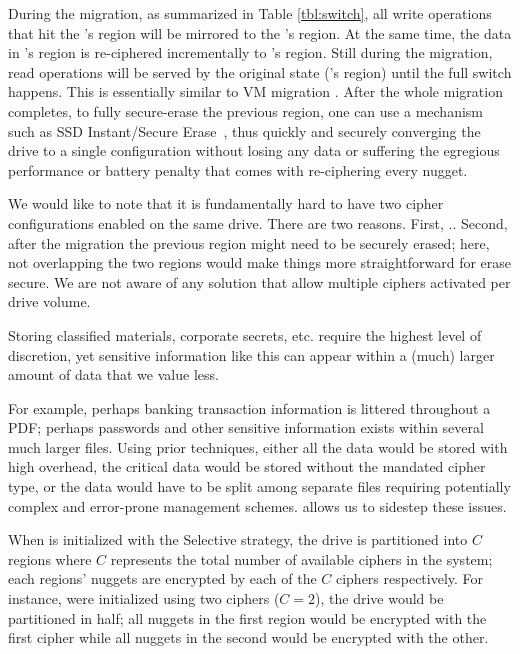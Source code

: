 During the migration, as summarized in Table \cref{tbl:switch}, all write
operations that hit the \cone's region will be mirrored to the \ctwo's region.
At the same time, the data in \cone's region is re-ciphered incrementally to
\ctwo's region. Still during the migration, read operations will be served by
the original state (\cone's region) until the full switch happens. This is
essentially similar to VM migration \cite{google-live-vm-migration-nsdi}. After
the whole migration completes, to fully secure-erase the previous region, one
can use a mechanism such as SSD Instant/Secure Erase~\cite{ISE1,ISE2,ISE3}, thus
quickly and securely converging the drive to a single configuration without
losing any data or suffering the egregious performance or battery penalty that
comes with re-ciphering every nugget.

We would like to note that it is fundamentally hard to have two cipher
configurations enabled on the same drive. There are two reasons. First,
.. Second, after the migration the
previous region might need to be securely erased; here, not overlapping the two
regions would make things more straightforward for erase secure. We are not
aware of any solution that allow multiple ciphers activated per drive volume.



 Storing classified materials, corporate secrets,
etc. require the highest level of discretion, yet sensitive information like
this can appear within a (much) larger amount of data that we value less.

For example, perhaps banking transaction information is littered throughout a
PDF; perhaps passwords and other sensitive information exists within several
much larger files. Using prior techniques, either all the data would be stored
with high overhead, the critical data would be stored without the mandated
cipher type, or the data would have to be split among separate files requiring
potentially complex and error-prone management schemes. \sys allows us to
sidestep these issues.


When \sys is initialized with the Selective strategy, the drive is partitioned
into $C$ regions where $C$ represents the total number of available ciphers in
the system; each regions' nuggets are encrypted by each of the $C$ ciphers
respectively. For instance, were \sys initialized using two ciphers ($C = 2$),
the drive would be partitioned in half; all nuggets in the first region would be
encrypted with the first cipher while all nuggets in the second would be
encrypted with the other.

